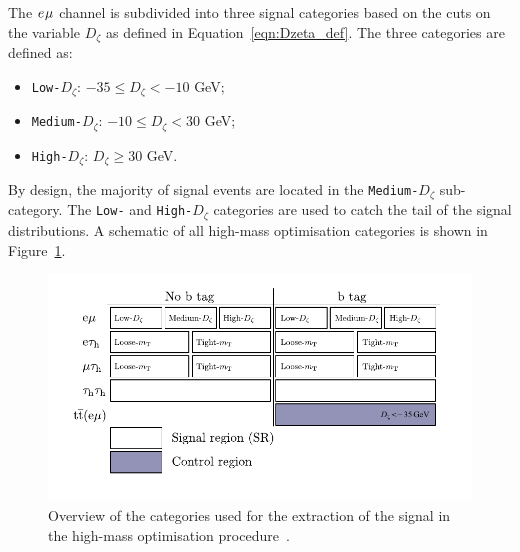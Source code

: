 The $e_{}\mu_{}$ channel is subdivided into three signal categories based on the cuts on the variable $D_{\zeta}$ as defined in Equation~\ref{eqn:Dzeta_def}.
The three categories are defined as:
\begin{itemize}
\item \texttt{Low-$D_\zeta$}: $-35 \leq D_\zeta < -10$ GeV;
\item \texttt{Medium-$D_\zeta$}: $-10 \leq D_\zeta <  30$ GeV;
\item \texttt{High-$D_\zeta$}: $D_\zeta \geq 30$ GeV.
\end{itemize}
By design, the majority of signal events are located in the \texttt{Medium-$D_\zeta$} sub-category.
The \texttt{Low-} and \texttt{High-$D_\zeta$} categories are used to catch the tail of the signal distributions.
A schematic of all high-mass optimisation categories is shown in Figure~\ref{fig:high_mass_categories}. \\

\begin{figure}[t]
\centering
    \includegraphics[width=\textwidth]{Figures/high_mass_categories.pdf}
\caption[Diagram of the categories in the high-mass optimisation procedure.]{Overview of the categories used for the extraction of the signal in the high-mass optimisation procedure~\cite{CMS:2022rbd}.}
\label{fig:high_mass_categories}
\end{figure}

